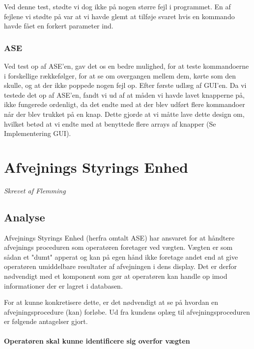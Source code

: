 \documentclass[a4paper]{article}
\begin{document}
Ved denne test, stødte vi dog ikke på nogen større fejl i programmet. En af fejlene vi stødte på var at vi havde glemt at tilføje svaret hvis en kommando havde fået en forkert parameter ind.


\subsubsection{ASE} %

Ved test op af ASE’en, gav det os en bedre mulighed, for at teste kommandoerne i forskellige rækkefølger, for at se om overgangen mellem dem, kørte som den skulle, og at der ikke poppede nogen fejl op. Efter første udlæg af GUI’en. Da vi testede det op af ASE’en, fandt vi ud af at måden vi havde lavet knapperne på, ikke fungerede ordenligt, da det endte med at der blev udført flere kommandoer når der blev trukket på en knap. Dette gjorde at vi måtte lave dette design om, hvilket betød at vi endte med at benyttede flere arrays af knapper (Se Implementering GUI).



\clearpage



\section{Afvejnings Styrings Enhed} %
\emph{Skrevet af Flemming}

\subsection{Analyse} %

Afvejnings Styrings Enhed (herfra omtalt ASE) har ansvaret for at håndtere afvejnings proceduren som operatøren foretager ved vægten. Vægten er som sådan et "dumt" apperat og kan på egen hånd ikke foretage andet end at give operatøren umiddelbare resultater af afvejningen i dens display. Det er derfor nødvendigt med et komponent som gør at operatøren kan handle op imod informationer der er lagret i databasen.

For at kunne konkretisere dette, er det nødvendigt at se på hvordan en afvejningsprocedure (kan) forløbe. Ud fra kundens oplæg til afvejningsproceduren er følgende antagelser gjort.

\paragraph{Operatøren skal kunne identificere sig overfor vægten} %
\end{document}
